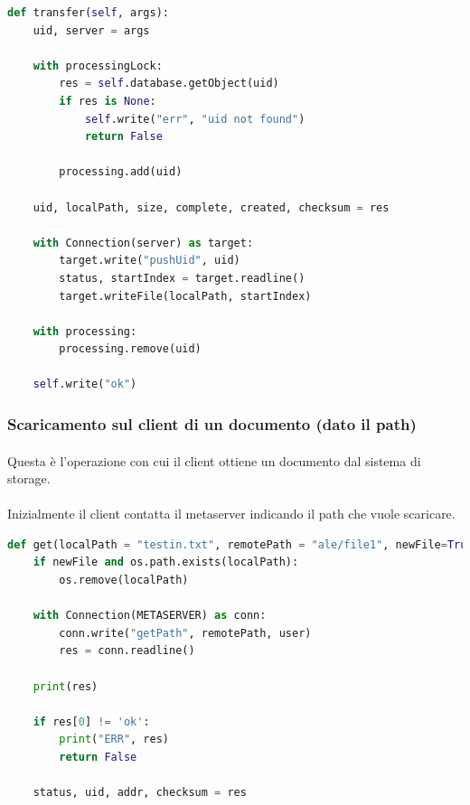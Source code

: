 \documentclass{article}
\begin{document}
\begin{lstlisting}[language=Python, title=Dataserver sorgente]
def transfer(self, args):
    uid, server = args

    with processingLock:
        res = self.database.getObject(uid)
        if res is None:
            self.write("err", "uid not found")
            return False

        processing.add(uid)

    uid, localPath, size, complete, created, checksum = res

    with Connection(server) as target:
        target.write("pushUid", uid)
        status, startIndex = target.readline()
        target.writeFile(localPath, startIndex)

    with processing:
        processing.remove(uid)

    self.write("ok")
\end{lstlisting}



\subsubsection{Scaricamento sul client di un documento (dato il path)}

\paragraph{} Questa è l'operazione con cui il client ottiene un documento dal sistema di storage.

\paragraph{} Inizialmente il client contatta il metaserver indicando il path che vuole scaricare.

\begin{lstlisting}[language=Python, title=Client]
def get(localPath = "testin.txt", remotePath = "ale/file1", newFile=True, user="default"):
    if newFile and os.path.exists(localPath):
        os.remove(localPath)

    with Connection(METASERVER) as conn:
        conn.write("getPath", remotePath, user)
        res = conn.readline()

    print(res)

    if res[0] != 'ok':
        print("ERR", res)
        return False

    status, uid, addr, checksum = res
\end{lstlisting}
\end{document}
